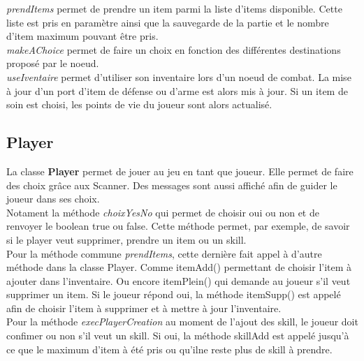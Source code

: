 		\textit{prendItems} permet de prendre un item parmi la liste d'items disponible. Cette liste est pris en paramètre ainsi que la sauvegarde de la partie et le nombre d'item maximum pouvant être pris.\\

		\textit{makeAChoice} permet de faire un choix en fonction des différentes destinations proposé par le noeud.\\

		\textit{useIventaire} permet d'utiliser son inventaire lors d'un noeud de combat. La mise à jour d'un port d'item de défense ou d'arme est alors mis à jour. Si un item de soin est choisi, les points de vie du joueur sont alors actualisé.\\

	\subsection{Player}
		La classe \textbf{Player} permet de jouer au jeu en tant que joueur. Elle permet de faire des choix grâce aux Scanner. Des messages sont aussi affiché afin de guider le joueur dans ses choix.\\
		Notament la méthode \textit{choixYesNo} qui permet de choisir oui ou non et de renvoyer le boolean true ou false. Cette méthode permet, par exemple, de savoir si le player veut supprimer, prendre un item ou un skill.\\
		Pour la méthode commune \textit{prendItems}, cette dernière fait appel à d'autre méthode dans la classe Player. Comme itemAdd() permettant de choisir l'item à ajouter dans l'inventaire. Ou encore itemPlein() qui demande au joueur s'il veut supprimer un item. Si le joueur répond oui, la méthode itemSupp() est appelé afin de choisir l'item à supprimer et à mettre à jour l'inventaire.\\
		Pour la méthode \textit{execPlayerCreation} au moment de l'ajout des skill, le joueur doit confimer ou non s'il veut un skill. Si oui, la méthode skillAdd est appelé jusqu'à ce que le maximum d'item à été pris ou qu'ilne reste plus de skill à prendre.\\

